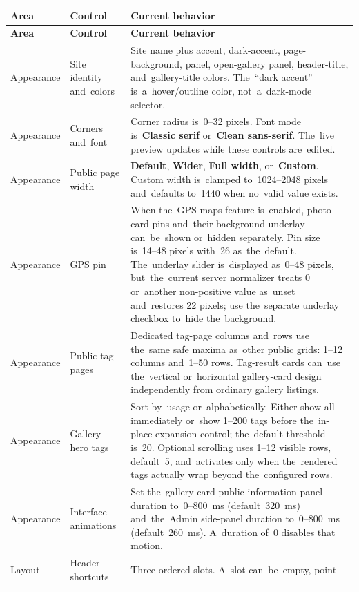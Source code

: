 \documentclass[11pt,a4paper]{article}
\newcommand{\ui}[1]{\textbf{#1}}
\begin{document}
\begin{longtable}{%
    >{\raggedright\arraybackslash}p{}%
    >{\raggedright\arraybackslash}p{}%
    >{\raggedright\arraybackslash}p{}%
}
\toprule
\textbf{Area} & \textbf{Control} & \textbf{Current behavior}\\
\midrule
\endfirsthead
\toprule
\textbf{Area} & \textbf{Control} & \textbf{Current behavior}\\
\midrule
\endhead
Appearance & Site identity and~colors & Site name plus accent, dark-accent,
page-background, panel, open-gallery panel, header-title, and~gallery-title
colors. The~``dark accent'' is~a~hover/outline color, not~a~dark-mode
selector.\\
Appearance & Corners and~font & Corner radius is~0--32 pixels. Font mode
is~\ui{Classic serif} or~\ui{Clean sans-serif}. The~live preview updates while
these controls are~edited.\\
Appearance & Public page width & \ui{Default}, \ui{Wider}, \ui{Full width},
or~\ui{Custom}. Custom width is~clamped to~1024--2048 pixels and~defaults
to~1440 when no~valid value exists.\\
Appearance & GPS pin & When the~GPS-maps feature is~enabled, photo-card pins
and~their background underlay can~be~shown or~hidden separately. Pin size
is~14--48 pixels with~26 as~the~default. The~underlay slider is~displayed
as~0--48 pixels, but~the~current server normalizer treats 0 or~another
non-positive value as~unset and~restores 22 pixels; use the~separate underlay
checkbox to~hide the~background.\\
Appearance & Public tag pages & Dedicated tag-page columns and~rows use the~same
safe maxima as~other public grids: 1--12 columns and~1--50 rows. Tag-result
cards can~use the~vertical or~horizontal gallery-card design independently from
ordinary gallery listings.\\
Appearance & Gallery hero tags & Sort by~usage or~alphabetically. Either show
all immediately or~show 1--200 tags before the~in-place expansion control;
the~default threshold is~20. Optional scrolling uses 1--12 visible rows,
default~5, and~activates only when the~rendered tags actually wrap beyond
the~configured rows.\\
Appearance & Interface animations & Set the~gallery-card
public-information-panel duration to~0--800~ms (default~320~ms) and~the~Admin
side-panel duration to~0--800~ms (default~260~ms). A~duration of~0 disables that
motion.\\
Layout & Header shortcuts & Three ordered slots. A~slot can~be~empty, point

\end{longtable}
\end{document}
